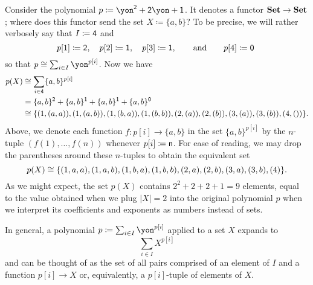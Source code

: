 \documentclass[Book-Poly]{subfiles}
\begin{document}
\begin{example}\label{ex.verbose_poly_eval}
    Consider the polynomial $p\coloneqq\yon^\2+\2\yon+\1$.
    It denotes a functor $\mathbf{Set}\to\mathbf{Set}$; where does this functor send the set $X\coloneqq\{a,b\}$?
    To be precise, we will rather verbosely say that $I\coloneqq\textsf{4}$ and
    \[
    p[1]\coloneqq\textsf{2},\quad
    p[2]\coloneqq\textsf{1},\quad
    p[3]\coloneqq\textsf{1},\qquad\text{and}\qquad
    p[4]\coloneqq\textsf{0}\
    \]
    so that $p\cong\sum_{i\in I}\yon^{p[i]}$. Now we have
    \begin{align*}
        p(X) &\cong
        \sum_{i\in\textsf{4}}\{a,b\}^{p[i]} \\ &=
        \{a,b\}^{\textsf{2}} + \{a,b\}^{\textsf{1}} + \{a,b\}^{\textsf{1}} + \{a,b\}^{\textsf{0}} \\ &\cong
        \{(1,(a,a)),(1,(a,b)),(1,(b,a)),(1,(b,b)),(2,(a)),(2,(b)),(3,(a)),(3,(b)),(4,())\}.
    \end{align*}
    Above, we denote each function $f\colon p[i]\to\{a,b\}$ in the set $\{a,b\}^{p[i]}$ by the $n$-tuple $(f(1),\ldots,f(n))$ whenever $p[i]\coloneqq\mathsf{n}$.
    For ease of reading, we may drop the parentheses around these $n$-tuples to obtain the equivalent set
    \[
    p(X) \cong
    \{(1,a,a),(1,a,b),(1,b,a),(1,b,b),(2,a),(2,b),(3,a),(3,b),(4)\}.
    \]
    As we might expect, the set $p(X)$ contains $2^2+2+2+1=9$ elements, equal to the value obtained when we plug $|X|=2$ into the original polynomial $p$ when we interpret its coefficients and exponents as numbers instead of sets.
\end{example}

In general, a polynomial $p\coloneqq\sum_{i\in I}\yon^{p[i]}$ applied to a set $X$ expands to
\[
\sum_{i\in I}X^{p[i]}
\]
and can be thought of as the set of all pairs comprised of an element of $I$ and a function $p[i]\to X$ or, equivalently, a $p[i]$-tuple of elements of $X$.
\end{document}
